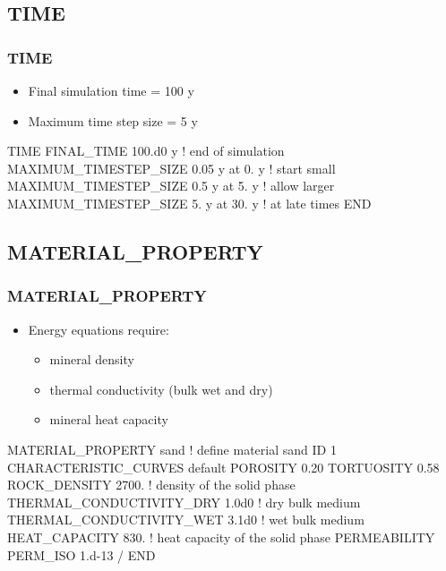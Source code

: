 \documentclass{beamer}
\newcommand\redcomment[1]{{{\color{red} #1}}}
\newcommand\bluecomment[1]{{{\color{blue} #1}}}
\newcommand\greencomment[1]{{{\color{green} #1}}}
\begin{document}
\subsection{TIME}

\begin{frame}[fragile]\frametitle{TIME}
\begin{itemize}
  \item \redcomment{Final} simulation \redcomment{time} = 100 y
  \item \redcomment{Maximum time step size} = 5 y
\end{itemize}

\begin{semiverbatim}

TIME
  FINAL_TIME 100.d0 y \bluecomment{! end of simulation}
  MAXIMUM_TIMESTEP_SIZE 0.05 y at 0. y \bluecomment{! start small}
  MAXIMUM_TIMESTEP_SIZE 0.5 y at 5. y \bluecomment{! allow larger}
  MAXIMUM_TIMESTEP_SIZE 5. y at 30. y \bluecomment{! at late times}
END
\end{semiverbatim}

\end{frame}

\subsection{MATERIAL\_PROPERTY}

\begin{frame}[fragile]\frametitle{MATERIAL\_PROPERTY}
\begin{itemize}
  \item Energy equations require:
  \begin{itemize}
    \item \redcomment{mineral density}
    \item \redcomment{thermal conductivity} (bulk wet and dry)
    \item \redcomment{mineral heat capacity}
  \end{itemize}
\end{itemize}

\begin{semiverbatim}
MATERIAL_PROPERTY sand \bluecomment{! define material} \greencomment{sand}
  ID 1
  CHARACTERISTIC_CURVES default
  POROSITY 0.20
  TORTUOSITY 0.58
  ROCK_DENSITY 2700. \bluecomment{! density of the solid phase}
  THERMAL_CONDUCTIVITY_DRY 1.0d0 \bluecomment{! dry bulk medium}
  THERMAL_CONDUCTIVITY_WET 3.1d0 \bluecomment{! wet bulk medium}
  HEAT_CAPACITY 830. \bluecomment{! heat capacity of the solid phase}
  PERMEABILITY
    PERM_ISO 1.d-13
  /
END
\end{semiverbatim}

\end{frame}
\end{document}
